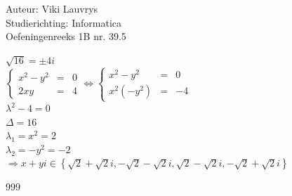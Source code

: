 \documentclass[a4paper]{article}
\begin{document}
  
\noindent \large Auteur: Viki Lauvrys        \\
\noindent \large Studierichting: Informatica \\
\noindent \large Oefeningenreeks 1B nr. 39.5 \\

\medskip

\normalsize
$\sqrt{16} = \pm 4i $ \\

$\left\{
	\begin{array}{lll}
		x^2 - y^2 & = & 0 \\
		2xy & = &  4
	\end{array}
\right .
\Leftrightarrow
\left\{
	\begin{array}{lll}
		x^2 - y^2 & = & 0 \\
		x^2 (-y^2) & = & -4
	\end{array}
\right . $ \\

$ \lambda^2 - 4 = 0 $ \\

$ \Delta = 16 $ \\

$ \lambda_1 = x^2 = 2 $ \\

$ \lambda_2 = -y^2 = -2 $ \\

$ \Rightarrow x + yi \in \left\{ \sqrt{2} + \sqrt{2}i, -\sqrt{2} - \sqrt{2}i, \sqrt{2} - \sqrt{2}i, -\sqrt{2} + \sqrt{2}i \right\} $ \\






\begin{thebibliography}{999}
\end{thebibliography}
\end{document}
